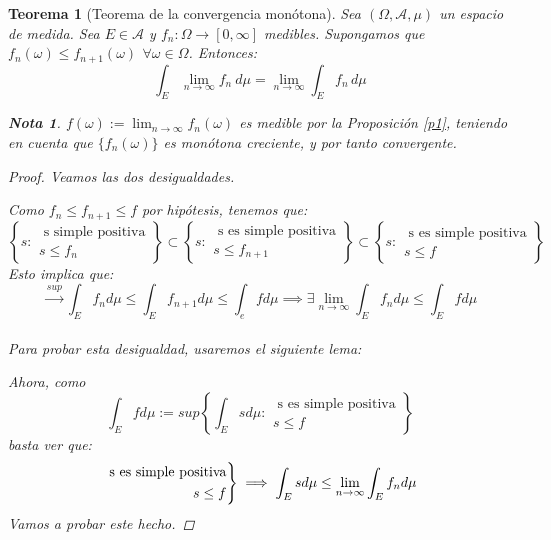 \documentclass[11pt, a4paper]{article}
\theoremstyle{theorem-style}
\newtheorem{nth}{Teorema}[section]
\theoremstyle{definition-style}
\theoremstyle{remark-style}
\newtheorem*{nota}{Nota}
\theoremstyle{example-style}
\newenvironment{rcases}
{\left.\begin{aligned}}
    {\end{aligned}\right\rbrace}
\begin{document}
\begin{nth}[Teorema de la convergencia monótona]
  Sea $(\Omega,\mathcal{A},\mu)$ un espacio de medida. Sea $E\in \mathcal A$ y $f_n: \Omega \to [0,\infty]$ medibles. Supongamos que $f_n(\omega) \leq f_{n+1}(\omega) \, \ \forall \omega \in \Omega$. Entonces:
  \[
    \int_E \lim_{n \to \infty} f_n\ d\mu = \lim_{n \to \infty}\int_E f_n\, d \mu
  \]
  \begin{nota}
    $\displaystyle f(\omega):= \lim _{n\to \infty} f_n(\omega)$ es medible por la \textit{Proposición \ref{p1}}, teniendo en cuenta que $\{f_n(\omega)\}$ es monótona creciente, y por tanto convergente.
  \end{nota}

  \begin{proof} Veamos las dos desigualdades.

    \boxed{\leq} Como $f_n \leq f_{n+1} \leq f$ por hipótesis, tenemos que:
    \[
    \left\{ s  : \begin{array}{r} \text{ s simple positiva}\\
        s \leq f_n 
      \end{array}\right\}  \subset \left\{ s: \begin{array}{r} \text{ s es simple positiva}\\
        s\leq f_{n+1}
	
      \end{array} \right\} \subset \left\{s: \begin{array}{r}\text{ s es simple positiva}\\ s \leq f
	
      \end{array}\right\}
    \]
    Esto implica que:
    \[
      \xrightarrow{sup} \int_E f_n d \mu \leq \int_E f_{n+1} d\mu \leq \int_e f d \mu \implies \exists \lim_{n\to \infty} \int_E f_n d\mu \leq \int_E f d \mu
    \]
    \boxed{\geq}\hfill \\
    Para probar esta desigualdad, usaremos el siguiente lema: 

    Ahora, como
    \[
      \int_E f d \mu:= sup \left\{\int_E s d\mu : \begin{array}{l} \text{ s es simple positiva}\\
        s \leq f
	
      \end{array}\right\}
    \]
    basta ver que:
    \[
      \begin{rcases}
	\text{ s es simple positiva}\\
	s \leq f
      \end{rcases} \implies \int_E s d\mu \leq \lim_{n\to \infty} \int_E f_n d\mu
    \]
    Vamos a probar este hecho.


\end{proof}
\end{nth}
\end{document}

